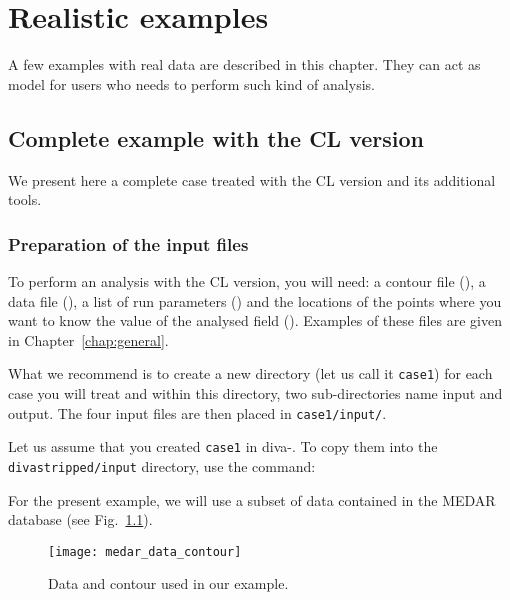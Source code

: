 \chapter{Realistic examples\label{chap:examples}}


A few examples with real data are described in this chapter. They can act as model for users who needs to perform such kind of analysis. 

\minitoc

\newpage

\section{Complete example with the CL version}

We present here a complete case treated with the CL version and its additional tools.


\subsection{Preparation of the input files\label{prep}}

To perform an analysis with the CL version, you will need: a contour file (), a data file (), a list of run parameters () and the locations of the points where you want to know the value of the analysed field (). Examples of these files are given in Chapter~\ref{chap:general}.

What we recommend is to create a new directory (let us call it \texttt{case1}) for each case you will treat and within this directory, two sub-directories name input and output. The four input files are then placed in \texttt{case1/input/}. 

Let us assume that you created \texttt{case1} in diva-\divaversion. To copy them into the \texttt{diva\-stripped/\-input} directory, use the command: 

\vspace{.25cm}


For the present example, we will use a subset of data contained in the MEDAR database (see Fig.~\ref{dataplotCL}). 

\begin{figure}[htpb]
\centering
\parbox{.65\textwidth}{
\texttt{[image: medar\_data\_contour]}
}\parbox{.35\textwidth}{
\caption{Data and contour used in our example.\label{dataplotCL}}
}
\end{figure}


